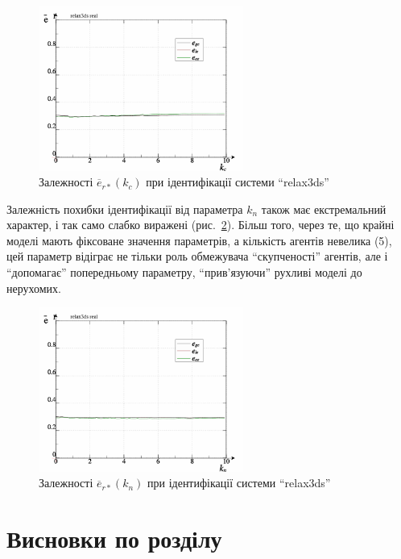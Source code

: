 \begin{figure}[htb!]
  \centerline{\includegraphics[width=0.6\textwidth]{p/relax3ds_read_id2_prm_0-p_k_cl.png} }
  \caption{Залежності $ \overline{e}_{r *} (k_c) $ при ідентифікації системи ``relax3ds''}
  \label{atu:f:relax3ds_read_id2_prm_0-p_k_c}
\end{figure}

Залежність похибки ідентифікації від параметра
$k_n$ також має екстремальний характер, і так само слабко виражені
(рис.~\ref{atu:f:relax3ds_read_id2_prm_0-p_k_n}). Більш того, через те, що крайні
моделі мають фіксоване значення параметрів, а кількість агентів
невелика (5), цей параметр відіграє не тільки роль обмежувача
``скупченості'' агентів, але і ``допомагає'' попередньому
параметру, ``прив'язуючи'' рухливі моделі до нерухомих.


\begin{figure}[htb!]
  \centerline{\includegraphics[width=0.6\textwidth]{p/relax3ds_read_id2_prm_0-p_k_cn.png} }
  \caption{Залежності $ \overline{e}_{r *} (k_n) $ при ідентифікації системи ``relax3ds''}
  \label{atu:f:relax3ds_read_id2_prm_0-p_k_n}
\end{figure}

\section{Висновки по розділу \thechapter}


